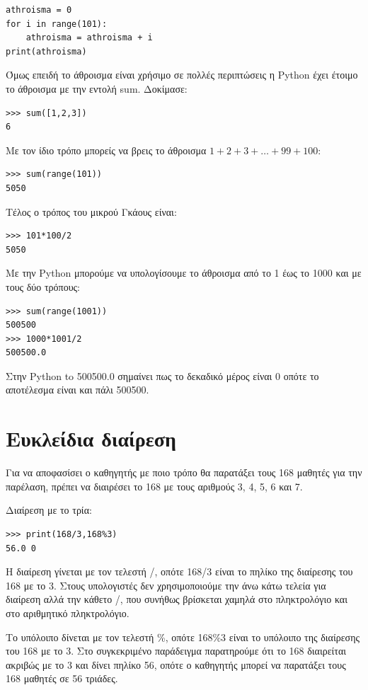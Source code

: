 \begin{lstlisting}
athroisma = 0
for i in range(101):
    athroisma = athroisma + i
print(athroisma)
\end{lstlisting}

Όμως επειδή το άθροισμα είναι χρήσιμο σε πολλές περιπτώσεις η Python έχει έτοιμο το άθροισμα με την εντολή sum. Δοκίμασε:
\begin{lstlisting}
>>> sum([1,2,3])
6
\end{lstlisting}

Με τον ίδιο τρόπο μπορείς να βρεις το άθροισμα $1 + 2 + 3+ \ldots + 99 + 100$:
\begin{lstlisting}
>>> sum(range(101))
5050
\end{lstlisting}

Τέλος ο τρόπος του μικρού Γκάους είναι:
\begin{lstlisting}
>>> 101*100/2
5050
\end{lstlisting}

Με την Python μπορούμε να υπολογίσουμε το άθροισμα από το 1 έως το 1000 και με τους δύο τρόπους:
\begin{lstlisting}
>>> sum(range(1001))
500500
>>> 1000*1001/2
500500.0
\end{lstlisting}
Στην Python to 500500.0 σημαίνει πως το δεκαδικό μέρος είναι 0 οπότε το αποτέλεσμα είναι και πάλι 500500.


\section{Ευκλείδια διαίρεση}

\begin{exercise}Για να αποφασίσει ο καθηγητής με ποιο τρόπο θα παρατάξει τους 168 μαθητές για την παρέλαση, πρέπει να διαιρέσει το 168 με τους αριθμούς 3, 4, 5, 6 και 7. \end{exercise}

Διαίρεση με το τρία:
\begin{lstlisting}
>>> print(168/3,168%3)
56.0 0
\end{lstlisting}
Η διαίρεση γίνεται με τον τελεστή /, οπότε 168/3 είναι το πηλίκο της διαίρεσης του 168 με το 3. Στους υπολογιστές δεν χρησιμοποιούμε την άνω κάτω τελεία για διαίρεση αλλά την κάθετο /, που συνήθως βρίσκεται χαμηλά στο πληκτρολόγιο και στο αριθμητικό πληκτρολόγιο. 

Το υπόλοιπο δίνεται με τον τελεστή \%, οπότε 168\%3 είναι το υπόλοιπο της διαίρεσης του 168 με το 3. Στο συγκεκριμένο παράδειγμα παρατηρούμε ότι το 168 διαιρείται ακριβώς με το 3 και δίνει πηλίκο 56, οπότε ο καθηγητής μπορεί να παρατάξει τους 168 μαθητές σε 56 τριάδες.

